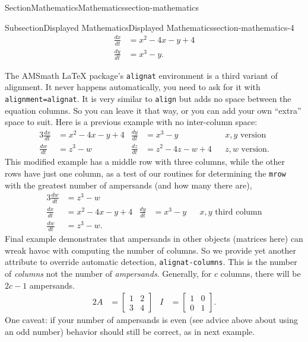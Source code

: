 \documentclass[twoside,10pt,]{article}
\newcommand{\mono}[1]{\texttt{#1}}
\numberwithin{equation}{section}
\newcommand{\myequation}[2]{#1\amp =#2}
\newcommand{\amp}{&}
\begin{document}
\begin{sectionptx}{Section}{Mathematics}{}{Mathematics}{}{}{section-mathematics}
\begin{subsectionptx}{Subsection}{Displayed Mathematics}{}{Displayed Mathematics}{}{}{section-mathematics-4}
\begin{align*}
\myequation{\frac{dx}{dt}}{x^2 - 4x - y + 4}\\
\myequation{\frac{dy}{dt}}{x^3 - y}.
\end{align*}
%
\par
The AMSmath \LaTeX{} package's \mono{alignat} environment is a third variant of alignment.  It never happens automatically, you need to ask for it with \mono{alignment=\textquotedbl{}alignat\textquotedbl{}}.  It is very similar to \mono{align} but adds no space between the equation columns.  So you can leave it that way, or you can add your own \textquotedblleft{}extra\textquotedblright{} space to suit.  Here is a previous example with no inter-column space:%
\begin{alignat*}{3}
\frac{dx}{dt} \amp = x^2 - 4x - y + 4 \amp \frac{dy}{dt} \amp = x^3 - y          \amp\amp x, y\text{ version}\\
\frac{dw}{dt} \amp = z^3 - w          \amp \frac{dz}{dt} \amp = z^2 - 4z - w + 4 \amp\amp z, w\text{ version}\text{.}
\end{alignat*}
This modified example has a middle row with three columns, while the other rows have just one column, as a test of our routines for determining the \mono{mrow} with the greatest number of ampersands (and how many there are),%
\begin{alignat*}{3}
\frac{dw}{dt} &= z^3 - w\\
\frac{dx}{dt} &= x^2 - 4x - y + 4 & \frac{dy}{dt} &= x^3 - y&& x, y\text{ third column}\\
\frac{dw}{dt} & = z^3 - w\text{.}
\end{alignat*}
Final example demonstrates that ampersands in other objects (matrices here) can wreak havoc with computing the number of columns.  So we provide yet another attribute to override automatic detection, \mono{alignat-columns}.  This is the number of \emph{columns} not the number of \emph{ampersands}.  Generally, for \(c\) columns, there will be \(2c-1\) ampersands.%
\begin{alignat*}{2}
A &= \begin{bmatrix}1 & 2 \\ 3 & 4\end{bmatrix}
&
I &= \begin{bmatrix}1 & 0 \\ 0 & 1\end{bmatrix}\text{.}
\end{alignat*}
One caveat: if your number of ampersands is even (see advice above about using an odd number) behavior should still be correct, as in next example.%

\end{subsectionptx}
\end{sectionptx}
\end{document}
